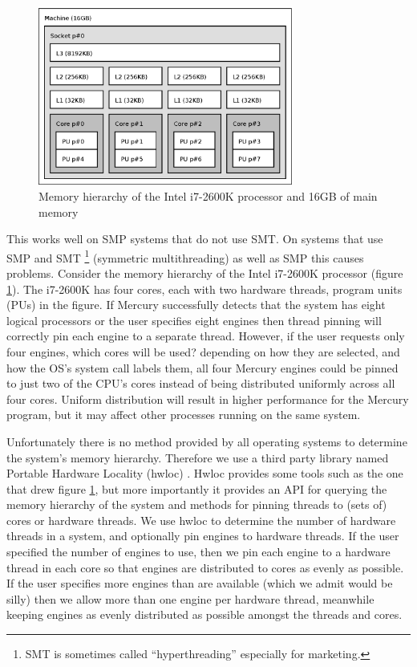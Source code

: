 
\begin{figure}
\begin{center}
\includegraphics[width=0.75\textwidth]{i7-hierarchy}
\end{center}
\caption{Memory hierarchy of the Intel i7-2600K processor and 16GB of main
memory}
\label{fig:i7_hierarchy}
\end{figure}

This works well on SMP systems that do not use SMT.
On systems that use SMP and SMT
\footnote{
    SMT is sometimes called ``hyperthreading'' especially for marketing.}
(symmetric multithreading) as well as SMP this causes problems.
Consider the memory hierarchy of the Intel i7-2600K processor
(figure \ref{fig:i7_hierarchy}).
The i7-2600K has four cores, each with two hardware threads,
program units (PUs) in the figure.
If Mercury successfully detects that the system has eight logical processors
or the user specifies eight engines then thread pinning will correctly pin
each engine to a separate thread.
However,
if the user requests only four engines, which cores will be used?
depending on how they are selected,
and how the OS's  system call labels them,
all four Mercury engines could be pinned to just two of the CPU's cores
instead of being distributed uniformly across all four cores.
Uniform distribution will result in higher performance for the Mercury
program,
but it may affect other processes running on the same system.

Unfortunately there is no method provided by all operating systems to
determine the system's memory hierarchy.
Therefore we use a third party library
named Portable Hardware Locality (hwloc) \citep{broquedis:2010:hwloc}.
Hwloc provides some tools such as the one that drew figure
\ref{fig:i7_hierarchy},
but more importantly it provides an API for querying the memory hierarchy of
the system and methods for pinning threads to (sets of) cores or hardware
threads.
We use hwloc to determine the number of hardware threads in a system,
and optionally pin engines to hardware threads.
If the user specified the number of engines to use,
then we pin each engine to a hardware thread in each core so that engines
are distributed to cores as evenly as possible.
If the user specifies more engines than are available
(which we admit would be silly) then we allow more than one engine per
hardware thread,
meanwhile keeping engines as evenly distributed as possible amongst the
threads and cores.


